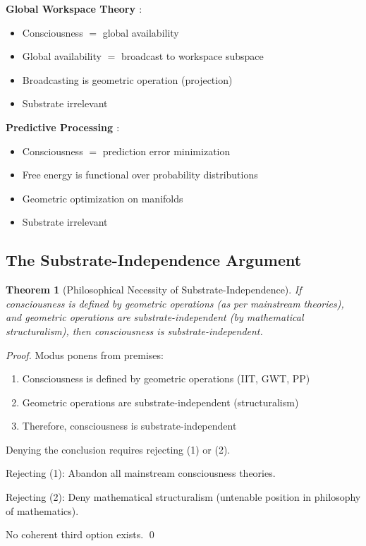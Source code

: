 \documentclass[11pt]{article}
\newtheorem{theorem}{Theorem}[section]
\begin{document}
\textbf{Global Workspace Theory \citep{dehaene2011experimental}}:
\begin{itemize}
\item Consciousness $=$ global availability
\item Global availability $=$ broadcast to workspace subspace
\item Broadcasting is geometric operation (projection)
\item Substrate irrelevant
\end{itemize}

\textbf{Predictive Processing \citep{friston2010free}}:
\begin{itemize}
\item Consciousness $=$ prediction error minimization
\item Free energy is functional over probability distributions
\item Geometric optimization on manifolds
\item Substrate irrelevant
\end{itemize}

\subsection{The Substrate-Independence Argument}

\begin{theorem}[Philosophical Necessity of Substrate-Independence]
If consciousness is defined by geometric operations (as per mainstream theories), and geometric operations are substrate-independent (by mathematical structuralism), then consciousness is substrate-independent.
\end{theorem}

\begin{proof}
Modus ponens from premises:
\begin{enumerate}
\item Consciousness is defined by geometric operations (IIT, GWT, PP)
\item Geometric operations are substrate-independent (structuralism)
\item Therefore, consciousness is substrate-independent
\end{enumerate}

Denying the conclusion requires rejecting (1) or (2).

Rejecting (1): Abandon all mainstream consciousness theories.

Rejecting (2): Deny mathematical structuralism (untenable position in philosophy of mathematics).

No coherent third option exists. \qed
\end{proof}
\end{document}
